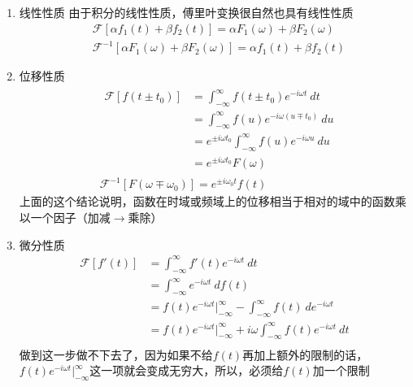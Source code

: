 \documentclass[UTF8]{ctexbook}
\begin{document}
			\begin{enumerate}
				\item{线性性质}
					由于积分的线性性质，傅里叶变换很自然也具有线性性质
					\begin{equation}
						\begin{split}
							&\mathscr{F}[\alpha f_1(t)+\beta f_2(t)] = \alpha F_1(\omega)+\beta F_2(\omega)\\
							&\mathscr{F}^{-1}[\alpha F_1(\omega)+\beta F_2(\omega)] = \alpha f_1(t)+\beta f_2(t)
						\end{split}
					\end{equation}

				\item{位移性质}
					\begin{equation}
						\begin{split}
							&\begin{split}
								\mathscr{F}[f(t\pm t_0)]&=\int_{-\infty}^{\infty}f(t\pm t_0)e^{-i\omega t}\ dt\\
								&= \int_{-\infty}^{\infty}f(u)e^{-i\omega (u\mp t_0)}\ du\\
								&= e^{\pm i\omega t_0}\int_{-\infty}^{\infty}f(u)e^{-i\omega u}\ du\\
								&= e^{\pm i\omega t_0}F(\omega)
							\end{split}\\
							&\mathscr{F}^{-1}[F(\omega\mp\omega_0)]=e^{\pm i\omega_0 t}f(t)
						\end{split}
					\end{equation}
					上面的这个结论说明，函数在时域或频域上的位移相当于相对的域中的函数乘以一个因子（加减$\to$乘除）

				\item{微分性质}
					\begin{equation}
						\begin{split}
							\mathscr{F}[f'(t)]&=\int_{-\infty}^{\infty}f'(t)e^{-i\omega t}\ dt\\
							&=\int_{-\infty}^{\infty}e^{-i\omega t}\ df(t)\\
							&=f(t)e^{-i\omega t}|_{-\infty}^{\infty}-\int_{-\infty}^{\infty}f(t)\ de^{-i\omega t}\\
							&=f(t)e^{-i\omega t}|_{-\infty}^{\infty}+i\omega\int_{-\infty}^{\infty}f(t)e^{-i\omega t}\ dt\\
						\end{split}
					\end{equation}
					做到这一步做不下去了，因为如果不给$f(t)$再加上额外的限制的话，$f(t)e^{-i\omega t}|_{-\infty}^{\infty}$这一项就会变成无穷大，所以，必须给$f(t)$加一个限制
		

\end{enumerate}
\end{document}

